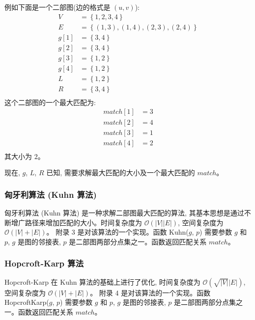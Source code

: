 例如下面是一个二部图(边的格式是 $(u, v)$): 
$$
\begin{aligned}
	V &= \left\{1, 2, 3, 4\right\} \\
	E &= \left\{(1, 3), (1, 4), (2, 3), (2, 4)\right\} \\
	g[1] &= \left\{3, 4\right\} \\
	g[2] &= \left\{3, 4\right\} \\
	g[3] &= \left\{1, 2\right\} \\
	g[4] &= \left\{1, 2\right\} \\
	L &= \left\{1, 2\right\} \\
	R &= \left\{3, 4\right\} \\
\end{aligned}
$$
这个二部图的一个最大匹配为:
$$
\begin{aligned}
	match[1] &= 3 \\
	match[2] &= 4 \\
	match[3] &= 1 \\
	match[4] &= 2 \\
\end{aligned}
$$
其大小为 $2$。

现在, $g$, $L$, $R$ 已知, 需要求解最大匹配的大小及一个最大匹配的 $match$。
\subsubsection{匈牙利算法 (Kuhn 算法)}
匈牙利算法 (Kuhn 算法) 是一种求解二部图最大匹配的算法, 其基本思想是通过不断增广路径来增加匹配的大小。时间复杂度为 $\mathcal{O}(\left|V\right|\left|E\right|)$, 空间复杂度为 $\mathcal{O}(\left|V\right| + \left|E\right|)$。
附录 3 是对该算法的一个实现。函数 Kuhn($g$, $p$) 需要参数 $g$ 和 $p$, $g$ 是图的邻接表, $p$ 是二部图两部分点集之一。函数返回匹配关系 $match$。
\subsubsection{Hopcroft-Karp 算法}
Hopcroft-Karp 在 Kuhn 算法的基础上进行了优化, 时间复杂度为 $\mathcal{O}(\sqrt{\left|V\right|}\left|E\right|)$, 空间复杂度为 $\mathcal{O}(\left|V\right| + \left|E\right|)$。
附录 4 是对该算法的一个实现。函数 HopcroftKarp($g$, $p$) 需要参数 $g$ 和 $p$, $g$ 是图的邻接表, $p$ 是二部图两部分点集之一。函数返回匹配关系 $match$。
